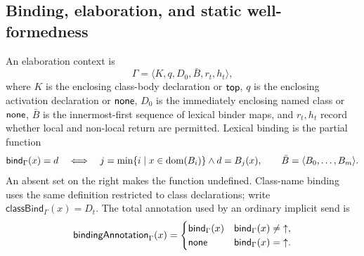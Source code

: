 \subsection{Binding, elaboration, and static well-formedness}
\label{sec:static-elaboration}

An elaboration context is
\begin{equation}\label{eq:elaboration-context}
 \Gamma=\langle K,q,D_0,\bar B,r_t,h_t\rangle,
\end{equation}
where $K$ is the enclosing class-body declaration or $\mathsf{top}$, $q$ is the
enclosing activation declaration or $\mathsf{none}$, $D_0$ is the immediately
enclosing named class or $\mathsf{none}$, $\bar B$ is the innermost-first sequence
of lexical binder maps, and $r_t,h_t$ record whether local and non-local return
are permitted.  Lexical binding is the partial function
\begin{equation}\label{eq:static-binding-function}
 \mathsf{bind}_{\Gamma}(x)=d
 \quad\Longleftrightarrow\quad
 j=\min\{i\mid x\in\mathop{\mathrm{dom}}(B_i)\}\land d=B_j(x),
 \qquad \bar B=\langle B_0,\ldots,B_m\rangle.
\end{equation}
An absent set on the right makes the function undefined.  Class-name binding
uses the same definition restricted to class declarations; write
$\mathsf{classBind}_{\Gamma}(x)=D_t$.
The total annotation used by an ordinary implicit send is
\begin{equation}\label{eq:implicit-binding-annotation}
 \mathsf{bindingAnnotation}_{\Gamma}(x)=
 \begin{cases}
  \mathsf{bind}_{\Gamma}(x)&\mathsf{bind}_{\Gamma}(x)\ne\mathord{\uparrow},\\
  \mathsf{none}&\mathsf{bind}_{\Gamma}(x)=\mathord{\uparrow}.
 \end{cases}
\end{equation}

